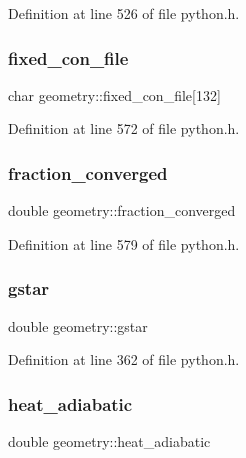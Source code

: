 Definition at line 526 of file python.\+h.

\mbox{\label{structgeometry_a8deac7ae205e9b683dd457b1ebfb5983}} 
\subsubsection{\texorpdfstring{fixed\+\_\+con\+\_\+file}{fixed\_con\_file}}
{\footnotesize\ttfamily char geometry\+::fixed\+\_\+con\+\_\+file\mbox{[}132\mbox{]}}



Definition at line 572 of file python.\+h.

\mbox{\label{structgeometry_a14e36d7ed328d1a6439a8215fa0944a6}} 
\subsubsection{\texorpdfstring{fraction\+\_\+converged}{fraction\_converged}}
{\footnotesize\ttfamily double geometry\+::fraction\+\_\+converged}



Definition at line 579 of file python.\+h.

\mbox{\label{structgeometry_a798697d796c9644b8785ba1e96337331}} 
\subsubsection{\texorpdfstring{gstar}{gstar}}
{\footnotesize\ttfamily double geometry\+::gstar}



Definition at line 362 of file python.\+h.

\mbox{\label{structgeometry_a5da14a1eb85f3dca6863b6acb86bef12}} 
\subsubsection{\texorpdfstring{heat\+\_\+adiabatic}{heat\_adiabatic}}
{\footnotesize\ttfamily double geometry\+::heat\+\_\+adiabatic}



